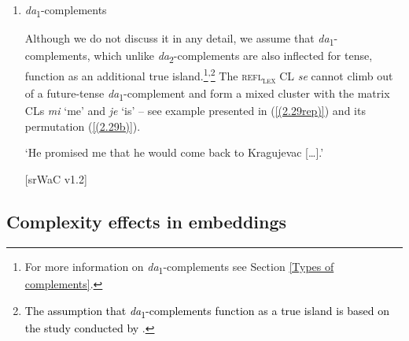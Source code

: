 \begin{enumerate}
\item \textit{da}\textsubscript{1}-complements 

\noindent Although we do not discuss it in any detail, we assume that \textit{da}\textsubscript{1}-com\-ple\-ments, which unlike \textit{da}\textsubscript{2}-complements are also inflected for tense, function as an additional true island.\footnote{For more information on \textit{da}\textsubscript{1}-complements see Section \ref{Types of complements}.}\textsuperscript{,}\footnote{\textcolor{black}{The assumption that \textit{da}\textsubscript{1}-complements function as a true island is based on the study conducted by \citet*{HKJ16}}.} The \textsc{refl\textsubscript{lex}} CL \textit{se} cannot climb out of a future-tense \textit{da}\textsubscript{1}-complement and form a mixed cluster with the matrix CLs \textit{mi} ‘me’ and \textit{je} ‘is’ – see example presented in (\ref{(2.29rep)}) and its permutation (\ref{(2.29b)}).

\begin{exe}\ex
\begin{xlist}
\end{xlist}
\glt ‘He promised me that he would come back to Kragujevac [\dots].’ \\
\strut\hfill [srWaC v1.2]
\end{exe}
\end{enumerate}

\subsection{Complexity effects in embeddings}
\label{Complexity effects in embeddings}

